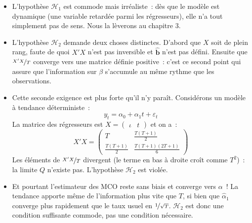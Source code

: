 \documentclass[10pt,a4paper]{article}
\theoremstyle{definition}
\renewcommand{\newline}{\unskip\par\vspace{1.5pt}}
\begin{document}
\begin{notes}

  \begin{itemize}

  \item L'hypothèse $\mathcal H_1$ est commode mais irréaliste~: dès que le modèle est
    dynamique (une variable retardée parmi les régresseurs), elle n'a tout simplement
    pas de sens. Nous la lèverons au chapitre 3.\newline

  \item L'hypothèse $\mathcal H_2$ demande deux choses distinctes. D'abord que $X$ soit
    de plein rang, faute de quoi $X'X$ n'est pas inversible et $\hat{\mathbf b}$ n'est
    pas défini. Ensuite que $\nicefrac{X'X}{T}$ converge vers une matrice définie
    positive~: c'est ce second point qui assure que l'information sur $\beta$
    s'accumule au même rythme que les observations.\newline

  \item Cette seconde exigence est plus forte qu'il n'y paraît. Considérons un modèle à
    tendance déterministe~:
    \[
      y_t = \alpha_0 + \alpha_1 t + \varepsilon_t
    \]
    La matrice des régresseurs est $X = \begin{pmatrix} \iota & t\end{pmatrix}$ et on a~:
    \[
      X'X =
      \begin{pmatrix}
        T                 & \frac{T(T+1)}{2}\\[2pt]
        \frac{T(T+1)}{2}  & \frac{T(T+1)(2T+1)}{6}
      \end{pmatrix}
    \]
    Les éléments de $\nicefrac{X'X}{T}$ divergent (le terme en bas à droite croît
    comme $T^2$)~: la limite $Q$ n'existe pas. L'hypothèse $\mathcal H_2$ est
    violée.\newline

  \item Et pourtant l'estimateur des MCO reste sans biais et converge vers $\alpha$~! La
    tendance apporte même de l'information \guillemotleft plus vite \guillemotright{}
    que $T$, si bien que $\hat\alpha_1$ converge plus rapidement que le taux usuel
    en $\nicefrac{1}{\sqrt T}$. $\mathcal H_2$ est donc une condition suffisante
    commode, pas une condition nécessaire.

  \end{itemize}

\end{notes}
\end{document}

